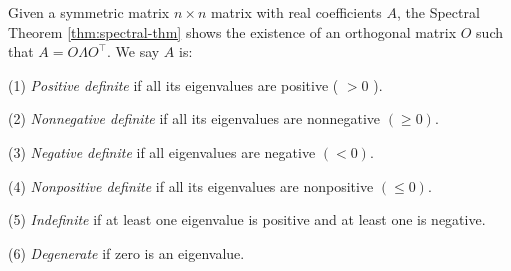 \begin{definition}\label{def:sq-sym-mat}
	Given a symmetric matrix $n \times n$ matrix with real coefficients $A$, the Spectral Theorem \ref{thm:spectral-thm} shows the existence of an orthogonal matrix $O$ such that $A = O \Lambda O^\top $. We say $A$ is:

	(1) \textit{Positive definite} if all its eigenvalues are positive ( $>0$ ).

	(2) \textit{Nonnegative definite} if all its eigenvalues are nonnegative $(\geq 0)$.

	(3) \textit{Negative definite} if all eigenvalues are negative $(<0)$.

	(4) \textit{Nonpositive definite} if all its eigenvalues are nonpositive $(\leq 0)$.

	(5) \textit{Indefinite} if at least one eigenvalue is positive and at least one is negative.

	(6) \textit{Degenerate} if zero is an eigenvalue.
\end{definition}

